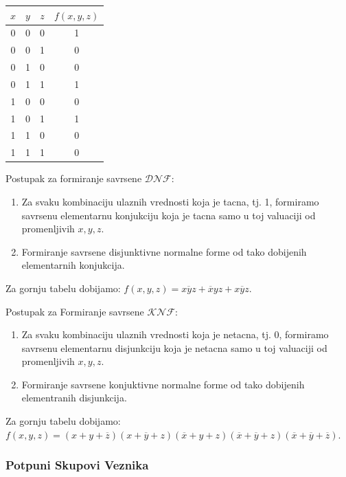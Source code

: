 \documentclass[12p,a4paper]{article}
\begin{document}
\begin{multicols}{2}
    \begin{tabular}{*{4}{c}}
        $x$ & $y$ & $z$ & $f(x, y, z)$ \\
        \midrule
        0 & 0 & 0 & 1 \\
        0 & 0 & 1 & 0 \\
        0 & 1 & 0 & 0 \\
        0 & 1 & 1 & 1 \\
        1 & 0 & 0 & 0 \\
        1 & 0 & 1 & 1 \\
        1 & 1 & 0 & 0 \\
        1 & 1 & 1 & 0 \\
    \end{tabular}

    Postupak za formiranje savrsene $\mathcal{DNF}$:
    \begin{enumerate}
        \itemsep0em
        \item Za svaku kombinaciju ulaznih vrednosti koja je tacna, tj. 1, 
              formiramo savrsenu elementarnu konjukciju koja je tacna samo u 
              toj valuaciji od promenljivih $x, y, z$.
        \item Formiranje savrsene disjunktivne normalne forme od tako 
              dobijenih elementarnih konjukcija.
    \end{enumerate}
    Za gornju tabelu dobijamo: 
    $f(x, y, z) = \overline{xyz} + \overline{x}yz + x\overline{y}z$.

    Postupak za Formiranje savrsene $\mathcal{KNF}$:
    \begin{enumerate}
        \itemsep0em
        \item Za svaku kombinaciju ulaznih vrednosti koja je netacna, tj. 0,
              formiramo savrsenu elementarnu disjunkciju koja je netacna samo u
              toj valuaciji od promenljivih $x, y, z$.
        \item Formiranje savrsene konjuktivne normalne forme od tako 
              dobijenih elementranih disjunkcija.
    \end{enumerate}
    Za gornju tabelu dobijamo:
    $f(x, y, z) = (x + y + \overline{z}) 
                  (x + \overline{y} + z)
                  (\overline{x} + y + z)
                  (\overline{x} + \overline{y} + z)
                  (\overline{x} + \overline{y} + \overline{z})$.

    \subsubsection{Potpuni Skupovi Veznika}


\end{multicols}
\end{document}
